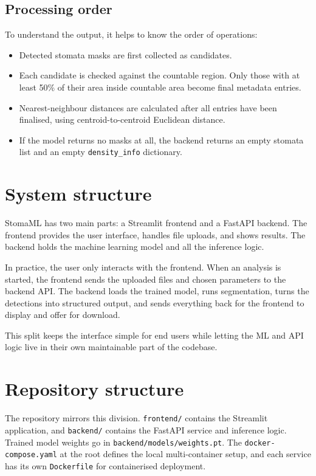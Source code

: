 \documentclass{article}
\begin{document}
\subsection{Processing order}

To understand the output, it helps to know the order of operations:

\begin{itemize}
    \item Detected stomata masks are first collected as candidates.
    \item Each candidate is checked against the countable region. Only those with at least 50\% of their area inside countable area become final metadata entries.
    \item Nearest-neighbour distances are calculated after all entries have been finalised, using centroid-to-centroid Euclidean distance.
    \item If the model returns no masks at all, the backend returns an empty stomata list and an empty \texttt{density\_info} dictionary.
\end{itemize}

\section{System structure}

StomaML has two main parts: a Streamlit frontend and a FastAPI backend. The frontend provides the user interface, handles file uploads, and shows results. The backend holds the machine learning model and all the inference logic.

In practice, the user only interacts with the frontend. When an analysis is started, the frontend sends the uploaded files and chosen parameters to the backend API. The backend loads the trained model, runs segmentation, turns the detections into structured output, and sends everything back for the frontend to display and offer for download.

This split keeps the interface simple for end users while letting the ML and API logic live in their own maintainable part of the codebase.

\section{Repository structure}

The repository mirrors this division. \texttt{frontend/} contains the Streamlit application, and \texttt{backend/} contains the FastAPI service and inference logic. Trained model weights go in \texttt{backend/models/weights.pt}. The \texttt{docker-compose.yaml} at the root defines the local multi-container setup, and each service has its own \texttt{Dockerfile} for containerised deployment.
\end{document}
